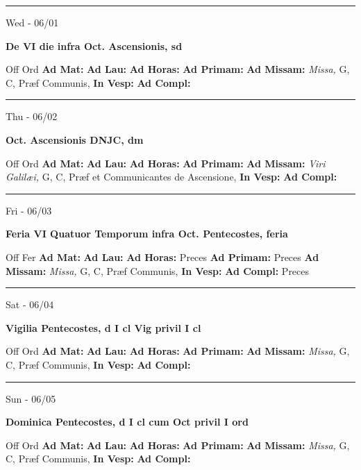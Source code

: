 \documentclass[letterpaper, 10pt]{article}
\begin{document}
\hrule
\begin{center}
Wed - 06/01
\end{center}\textbf{ \large De VI die infra Oct. Ascensionis, \textnormal{\normalsize sd}}
\begin{justify}
Off Ord
\textbf{Ad Mat: }
\textbf{Ad Lau: }
\textbf{Ad Horas: }
\textbf{Ad Primam: }
\textbf{Ad Missam:} \textit{Missa, } G, C, Præf Communis, 
\textbf{In Vesp: }
\textbf{Ad Compl: }\end{justify}



\hrule
\begin{center}
Thu - 06/02
\end{center}\textbf{ \large Oct. Ascensionis DNJC, \textnormal{\normalsize dm}}
\begin{justify}
Off Ord
\textbf{Ad Mat: }
\textbf{Ad Lau: }
\textbf{Ad Horas: }
\textbf{Ad Primam: }
\textbf{Ad Missam:} \textit{Viri Galilæi, } G, C, Præf et Communicantes de Ascensione, 
\textbf{In Vesp: }
\textbf{Ad Compl: }\end{justify}



\hrule
\begin{center}
Fri - 06/03
\end{center}\textbf{ \large Feria VI Quatuor Temporum infra Oct. Pentecostes, \textnormal{\normalsize feria}}
\begin{justify}
Off Fer
\textbf{Ad Mat: }
\textbf{Ad Lau: }
\textbf{Ad Horas: }Preces
\textbf{Ad Primam: }Preces
\textbf{Ad Missam:} \textit{Missa, } G, C, Præf Communis, 
\textbf{In Vesp: }
\textbf{Ad Compl: }Preces\end{justify}



\hrule
\begin{center}
Sat - 06/04
\end{center}\textbf{ \large Vigilia Pentecostes, \textnormal{\normalsize d I cl Vig privil I cl}}
\begin{justify}
Off Ord
\textbf{Ad Mat: }
\textbf{Ad Lau: }
\textbf{Ad Horas: }
\textbf{Ad Primam: }
\textbf{Ad Missam:} \textit{Missa, } G, C, Præf Communis, 
\textbf{In Vesp: }
\textbf{Ad Compl: }\end{justify}



\hrule
\begin{center}
Sun - 06/05
\end{center}\textbf{ \large Dominica Pentecostes, \textnormal{\normalsize d I cl cum Oct privil I ord}}
\begin{justify}
Off Ord
\textbf{Ad Mat: }
\textbf{Ad Lau: }
\textbf{Ad Horas: }
\textbf{Ad Primam: }
\textbf{Ad Missam:} \textit{Missa, } G, C, Præf Communis, 
\textbf{In Vesp: }
\textbf{Ad Compl: }\end{justify}
\end{document}
